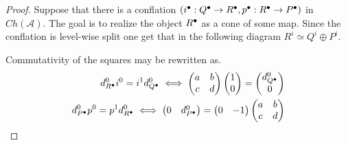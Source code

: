     \begin{proof}
        Suppose that there is a conflation $(i^{\bullet}:Q^{\bullet}\rightarrow R^{\bullet},p^{\bullet}:R^{\bullet}\rightarrow P^{\bullet})$ in $Ch(\mathcal{A})$. The goal is to realize the object $R^{\bullet}$ as a cone of some map. Since the conflation is level-wise split one get that in the following diagram $R^i\simeq Q^i\oplus P^i$.
        \begin{center}
        \end{center}

        Commutativity of the squares may be rewritten as.
        \begin{align*}
            d^0_{R^{\bullet}}i^0=i^1d^0_{Q^{\bullet}} \iff \begin{pmatrix} a & b \\ c & d \end{pmatrix}\begin{pmatrix} 1 \\ 0 \end{pmatrix} = \begin{pmatrix} d^0_{Q^{\bullet}} \\ 0 \end{pmatrix} \\
            d^0_{P^{\bullet}}p^0=p^1d^0_{R^{\bullet}} \iff \begin{pmatrix} 0 & d^0_{P^{\bullet}} \end{pmatrix} = \begin{pmatrix} 0 & -1 \end{pmatrix}\begin{pmatrix} a & b \\ c & d \end{pmatrix}
        \end{align*}


\end{proof}
